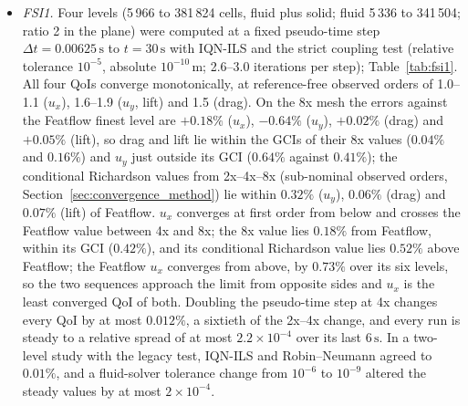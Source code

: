 \begin{itemize}
	\item \emph{FSI1.} Four levels (5\,966 to 381\,824 cells, fluid plus solid; fluid 5\,336 to 341\,504; ratio 2 in the plane) were computed at a fixed pseudo-time step $\Delta t = 0.00625\,\mathrm{s}$ to $t = 30\,\mathrm{s}$ with IQN-ILS and the strict coupling test (relative tolerance $10^{-5}$, absolute $10^{-10}\,\mathrm{m}$; 2.6--3.0 iterations per step); Table~\ref{tab:fsi1}. All four QoIs converge monotonically, at reference-free observed orders of 1.0--1.1 ($u_x$), 1.6--1.9 ($u_y$, lift) and 1.5 (drag). On the 8x mesh the errors against the Featflow finest level are $+0.18\%$ ($u_x$), $-0.64\%$ ($u_y$), $+0.02\%$ (drag) and $+0.05\%$ (lift), so drag and lift lie within the GCIs of their 8x values ($0.04\%$ and $0.16\%$) and $u_y$ just outside its GCI ($0.64\%$ against $0.41\%$); the conditional Richardson values from 2x--4x--8x (sub-nominal observed orders, Section~\ref{sec:convergence_method}) lie within $0.32\%$ ($u_y$), $0.06\%$ (drag) and $0.07\%$ (lift) of Featflow. $u_x$ converges at first order from below and crosses the Featflow value between 4x and 8x; the 8x value lies $0.18\%$ from Featflow, within its GCI ($0.42\%$), and its conditional Richardson value lies $0.52\%$ above Featflow; the Featflow $u_x$ converges from above, by $0.73\%$ over its six levels, so the two sequences approach the limit from opposite sides and $u_x$ is the least converged QoI of both. Doubling the pseudo-time step at 4x changes every QoI by at most $0.012\%$, a sixtieth of the 2x--4x change, and every run is steady to a relative spread of at most $2.2\times10^{-4}$ over its last $6\,\mathrm{s}$. In a two-level study with the legacy test, IQN-ILS and Robin--Neumann agreed to $0.01\%$, and a fluid-solver tolerance change from $10^{-6}$ to $10^{-9}$ altered the steady values by at most $2\times10^{-4}$.


\end{itemize}
